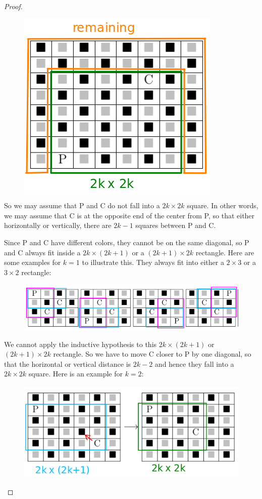 \documentclass[14pt]{extarticle}
\begin{document}
\begin{proof}
\begin{figure}[ht!]
\centering
\includegraphics[scale=0.5]{../images/5.3.40.b.1.png}
\end{figure}

So we may assume that P and C do not fall into a $2k \times 2k$ square. In other words, we may assume that C is at the opposite end of the center from P, so that either horizontally or vertically, there are $2k-1$ squares between P and C. 

Since P and C have different colors, they cannot be on the same diagonal, so P and C always fit inside a $2k \times (2k+1)$ or a $(2k+1) \times 2k$ rectangle. Here are some examples for $k = 1$ to illustrate this. They always fit into either a $2 \times 3$ or a $3 \times 2$ rectangle:

\begin{figure}[ht!]
\centering
\includegraphics[scale=0.6]{../images/5.3.40.b.2.png}
\end{figure}

We cannot apply the inductive hypothesis to this $2k \times (2k+1)$ or $(2k+1) \times 2k$ rectangle. So we have to move C closer to P by one diagonal, so that the horizontal or vertical distance is $2k-2$ and hence they fall into a $2k \times 2k$ square. Here is an example for $k = 2$:

\begin{figure}[ht!]
\centering
\includegraphics[scale=0.5]{../images/5.3.40.b.3.png}
\end{figure}


\end{proof}
\end{document}
